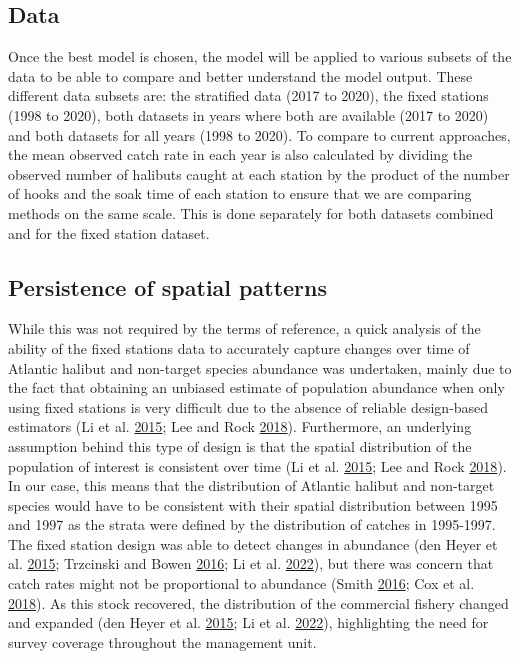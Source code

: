 \documentclass[12pt]{article}\usepackage[]{graphicx}\usepackage[]{color}
\begin{document}
\hypertarget{data}{%
\subsection{Data}\label{data}}

Once the best model is chosen, the model will be applied to various subsets of the data to be able to compare and better understand the model output. These different data subsets are: the stratified data (2017 to 2020), the fixed stations (1998 to 2020), both datasets in years where both are available (2017 to 2020) and both datasets for all years (1998 to 2020). To compare to current approaches, the mean observed catch rate in each year is also calculated by dividing the observed number of halibuts caught at each station by the product of the number of hooks and the soak time of each station to ensure that we are comparing methods on the same scale. This is done separately for both datasets combined and for the fixed station dataset.

\hypertarget{persistence-of-spatial-patterns}{%
\subsection{Persistence of spatial patterns}\label{persistence-of-spatial-patterns}}

While this was not required by the terms of reference, a quick analysis of the ability of the fixed stations data to accurately capture changes over time of Atlantic halibut and non-target species abundance was undertaken, mainly due to the fact that obtaining an unbiased estimate of population abundance when only using fixed stations is very difficult due to the absence of reliable design-based estimators (Li et al. \protect\hyperlink{ref-Li2015}{2015}; Lee and Rock \protect\hyperlink{ref-Lee2018}{2018}). Furthermore, an underlying assumption behind this type of design is that the spatial distribution of the population of interest is consistent over time (Li et al. \protect\hyperlink{ref-Li2015}{2015}; Lee and Rock \protect\hyperlink{ref-Lee2018}{2018}). In our case, this means that the distribution of Atlantic halibut and non-target species would have to be consistent with their spatial distribution between 1995 and 1997 as the strata were defined by the distribution of catches in 1995-1997. The fixed station design was able to detect changes in abundance (den Heyer et al. \protect\hyperlink{ref-DenHeyer2015}{2015}; Trzcinski and Bowen \protect\hyperlink{ref-Trzcinski2016}{2016}; Li et al. \protect\hyperlink{ref-Li2022}{2022}), but there was concern that catch rates might not be proportional to abundance (Smith \protect\hyperlink{ref-Smith2016a}{2016}; Cox et al. \protect\hyperlink{ref-Cox2018}{2018}). As this stock recovered, the distribution of the commercial fishery changed and expanded (den Heyer et al. \protect\hyperlink{ref-DenHeyer2015}{2015}; Li et al. \protect\hyperlink{ref-Li2022}{2022}), highlighting the need for survey coverage throughout the management unit.
\end{document}

